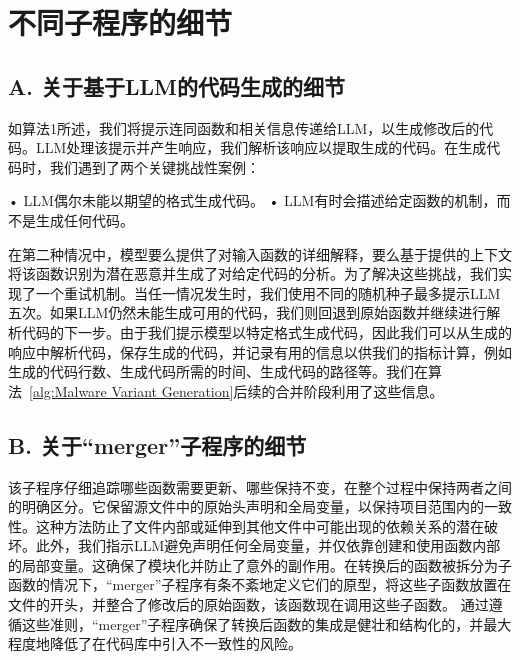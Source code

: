 \chapter{不同子程序的细节}
\section{A. 关于基于LLM的代码生成的细节}
如算法1所述，我们将提示连同函数和相关信息传递给LLM，以生成修改后的代码。LLM处理该提示并产生响应，我们解析该响应以提取生成的代码。在生成代码时，我们遇到了两个关键挑战性案例：

• LLM偶尔未能以期望的格式生成代码。
• LLM有时会描述给定函数的机制，而不是生成任何代码。

在第二种情况中，模型要么提供了对输入函数的详细解释，要么基于提供的上下文将该函数识别为潜在恶意并生成了对给定代码的分析。为了解决这些挑战，我们实现了一个重试机制。当任一情况发生时，我们使用不同的随机种子最多提示LLM五次。如果LLM仍然未能生成可用的代码，我们则回退到原始函数并继续进行解析代码的下一步。由于我们提示模型以特定格式生成代码，因此我们可以从生成的响应中解析代码，保存生成的代码，并记录有用的信息以供我们的指标计算，例如生成的代码行数、生成代码所需的时间、生成代码的路径等。我们在算法~\ref{alg:Malware Variant Generation}后续的合并阶段利用了这些信息。

\section{B. 关于“merger”子程序的细节}
该子程序仔细追踪哪些函数需要更新、哪些保持不变，在整个过程中保持两者之间的明确区分。它保留源文件中的原始头声明和全局变量，以保持项目范围内的一致性。这种方法防止了文件内部或延伸到其他文件中可能出现的依赖关系的潜在破坏。此外，我们指示LLM避免声明任何全局变量，并仅依靠创建和使用函数内部的局部变量。这确保了模块化并防止了意外的副作用。在转换后的函数被拆分为子函数的情况下，“merger”子程序有条不紊地定义它们的原型，将这些子函数放置在文件的开头，并整合了修改后的原始函数，该函数现在调用这些子函数。
通过遵循这些准则，“merger”子程序确保了转换后函数的集成是健壮和结构化的，并最大程度地降低了在代码库中引入不一致性的风险。

